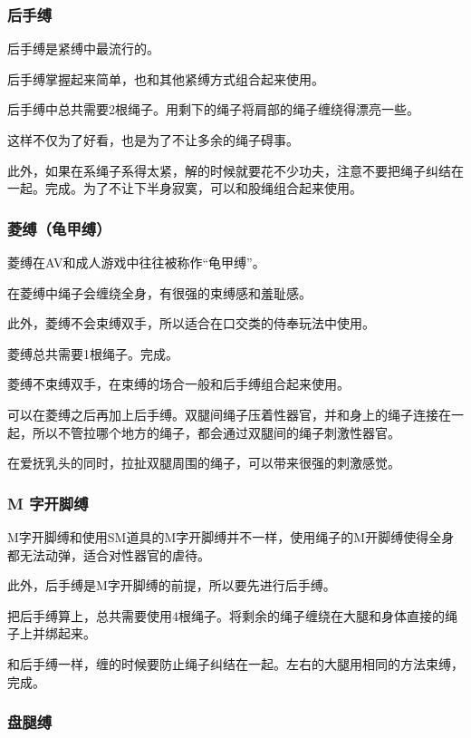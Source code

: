 \documentclass[12pt,UTF8]{ctexbook}
\begin{document}
\subsubsection{后手缚}

后手缚是紧缚中最流行的。

后手缚掌握起来简单，也和其他紧缚方式组合起来使用。

后手缚中总共需要2根绳子。用剩下的绳子将肩部的绳子缠绕得漂亮一些。

这样不仅为了好看，也是为了不让多余的绳子碍事。

此外，如果在系绳子系得太紧，解的时候就要花不少功夫，注意不要把绳子纠结在一起。完成。为了不让下半身寂寞，可以和股绳组合起来使用。

\subsubsection{菱缚（龟甲缚）}

菱缚在AV和成人游戏中往往被称作“龟甲缚”。

在菱缚中绳子会缠绕全身，有很强的束缚感和羞耻感。

此外，菱缚不会束缚双手，所以适合在口交类的侍奉玩法中使用。

菱缚总共需要1根绳子。完成。

菱缚不束缚双手，在束缚的场合一般和后手缚组合起来使用。

可以在菱缚之后再加上后手缚。双腿间绳子压着性器官，并和身上的绳子连接在一起，所以不管拉哪个地方的绳子，都会通过双腿间的绳子刺激性器官。

在爱抚乳头的同时，拉扯双腿周围的绳子，可以带来很强的刺激感觉。 

\subsubsection{M 字开脚缚}

M字开脚缚和使用SM道具的M字开脚缚并不一样，使用绳子的M开脚缚使得全身都无法动弹，适合对性器官的虐待。

此外，后手缚是M字开脚缚的前提，所以要先进行后手缚。

把后手缚算上，总共需要使用4根绳子。将剩余的绳子缠绕在大腿和身体直接的绳子上并绑起来。

和后手缚一样，缠的时候要防止绳子纠结在一起。左右的大腿用相同的方法束缚，完成。

\subsubsection{盘腿缚}
\end{document}
